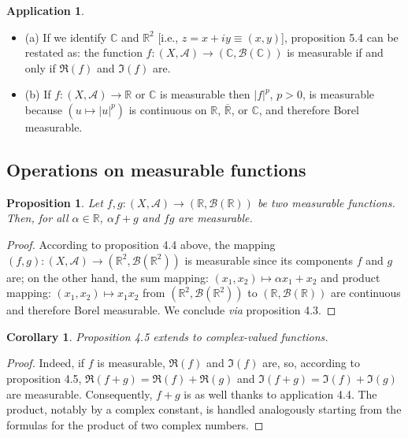 \documentclass[11pt]{article}
\newtheorem{proposition}{Proposition}[section]
\newtheorem{corollary}{Corollary}[section]
\theoremstyle{definition}
\newtheorem{application}{Application}[section]
\begin{document}
\begin{application}
    \begin{itemize}
    \item (a) If we identify $\mathbb{C}$ and $\mathbb{R}^2$ [i.e., $z = x + iy \equiv (x, y)$], proposition 5.4 can be restated as: the function $f : (X, \mathscr{A}) \to (\mathbb{C}, \mathscr{B}(\mathbb{C}))$ is measurable if and only if $\Re(f)$ and $\Im(f)$ are.

    \item (b) If $f : (X, \mathscr{A}) \to \mathbb{R}$ or $\mathbb{C}$ is measurable then $|f|^p$, $p > 0$, is measurable because $(u \mapsto |u|^p)$ is continuous on $\mathbb{R}$, $\overline{\mathbb{R}}$, or $\mathbb{C}$, and therefore Borel measurable.
\end{itemize}
\end{application}

\subsection{Operations on measurable functions}

\begin{proposition}
    Let $f, g : (X, \mathscr{A}) \to (\mathbb{R}, \mathscr{B}(\mathbb{R}))$ be two measurable functions. Then, for all $\alpha \in \mathbb{R}$, $\alpha f + g$ and $f g$ are measurable.
\end{proposition}
\begin{proof}
    According to proposition 4.4 above, the mapping $(f, g) : (X, \mathscr{A}) \to (\mathbb{R}^2, \mathscr{B}(\mathbb{R}^2))$ is measurable since its components $f$ and $g$ are; on the other hand, the sum mapping: $(x_1, x_2) \mapsto \alpha x_1 + x_2$ and product mapping: $(x_1, x_2) \mapsto x_1 x_2$ from $(\mathbb{R}^2, \mathscr{B}(\mathbb{R}^2))$ to $(\mathbb{R}, \mathscr{B}(\mathbb{R}))$ are continuous and therefore Borel measurable. We conclude \textit{via} proposition 4.3. 
\end{proof}

\begin{corollary}
    Proposition 4.5 extends to complex-valued functions.
\end{corollary}
\begin{proof}
    Indeed, if $f$ is measurable, $\Re(f)$ and $\Im(f)$ are, so, according to proposition 4.5, $\Re(f+g) = \Re(f) + \Re(g)$ and $\Im(f+g) = \Im(f) + \Im(g)$ are measurable. Consequently, $f+g$ is as well thanks to application 4.4. The product, notably by a complex constant, is handled analogously starting from the formulas for the product of two complex numbers. 
\end{proof}
\end{document}
